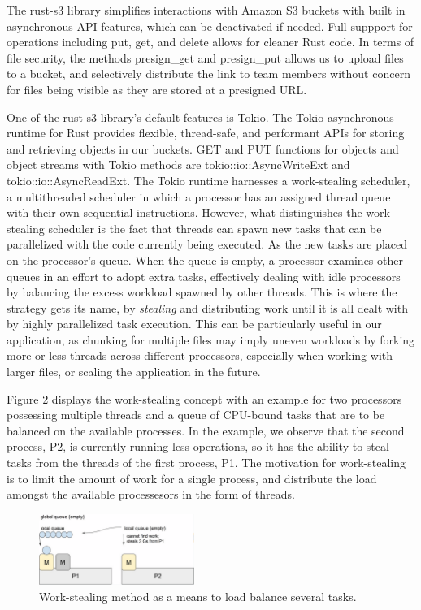 \documentclass[conference]{IEEEtran}
\begin{document}
The rust-s3 library simplifies interactions with Amazon S3 buckets with built in asynchronous API features, 
which can be deactivated if needed. Full suppport for operations including put, get, and delete allows for 
cleaner Rust code. In terms of file security, the methods presign\_get and presign\_put allows us to upload files
to a bucket, and selectively distribute the link to team members without concern for files being visible as
they are stored at a presigned URL. 

One of the rust-s3 library's default features is Tokio. The Tokio asynchronous runtime for Rust provides flexible, 
thread-safe, and performant APIs for storing and retrieving objects in our buckets. GET and PUT functions for objects
and object streams with Tokio methods are tokio::io::AsyncWriteExt and tokio::io::AsyncReadExt. The Tokio runtime harnesses
a work-stealing scheduler, a multithreaded scheduler in which a processor has an assigned thread queue with their own 
sequential instructions. However, what distinguishes the work-stealing scheduler is the fact that threads can spawn new tasks 
that can be parallelized with the code currently being executed. As the new tasks are placed on the processor's queue. When the 
queue is empty, a processor examines other queues in an effort to adopt extra tasks, effectively dealing with idle processors 
by balancing the excess workload spawned by other threads. This is where the strategy gets its name, by \textit{stealing} and
distributing work until it is all dealt with by highly parallelized task execution. This can be particularly useful in our 
application, as chunking for multiple files may imply uneven workloads by forking more or less threads across different processors, 
especially when working with larger files, or scaling the application in the future.

Figure 2 displays the work-stealing concept with an example for two processors possessing multiple threads and a queue of CPU-bound 
tasks that are to be balanced on the available processes. In the example, we observe that the second process, P2, is currently running less
operations, so it has the ability to steal tasks from the threads of the first process, P1. The motivation for work-stealing is to
limit the amount of work for a single process, and distribute the load amongst the available processesors in the form of threads. 

\begin{figure}[h]
	\caption{Work-stealing method as a means to load balance several tasks.}
	\centering
	\includegraphics[width=0.45\textwidth]{work-stealing.png}
\end{figure}
\end{document}
